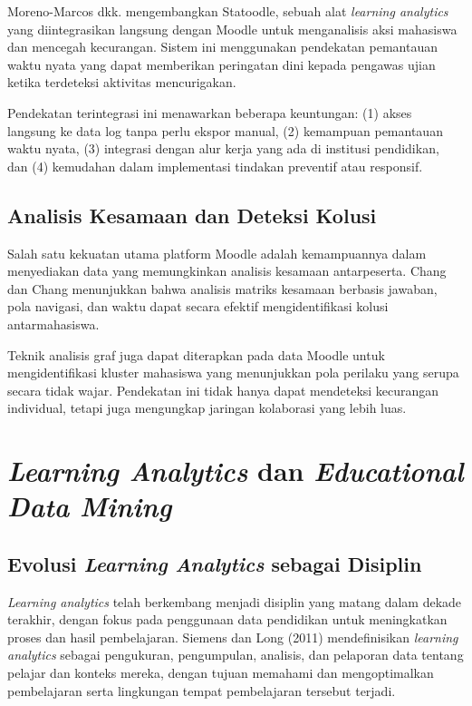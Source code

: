 Moreno-Marcos dkk. \cite{MorenoMarcos2023} mengembangkan Statoodle, sebuah alat \textit{learning analytics} yang diintegrasikan langsung dengan Moodle untuk menganalisis aksi mahasiswa dan mencegah kecurangan. Sistem ini menggunakan pendekatan pemantauan waktu nyata yang dapat memberikan peringatan dini kepada pengawas ujian ketika terdeteksi aktivitas mencurigakan.

Pendekatan terintegrasi ini menawarkan beberapa keuntungan: (1) akses langsung ke data log tanpa perlu ekspor manual, (2) kemampuan pemantauan waktu nyata, (3) integrasi dengan alur kerja yang ada di institusi pendidikan, dan (4) kemudahan dalam implementasi tindakan preventif atau responsif.

\subsection{Analisis Kesamaan dan Deteksi Kolusi}

Salah satu kekuatan utama platform Moodle adalah kemampuannya dalam menyediakan data yang memungkinkan analisis kesamaan antarpeserta. Chang dan Chang \cite{Chang2023} menunjukkan bahwa analisis matriks kesamaan berbasis jawaban, pola navigasi, dan waktu dapat secara efektif mengidentifikasi kolusi antarmahasiswa.

Teknik analisis graf juga dapat diterapkan pada data Moodle untuk mengidentifikasi kluster mahasiswa yang menunjukkan pola perilaku yang serupa secara tidak wajar. Pendekatan ini tidak hanya dapat mendeteksi kecurangan individual, tetapi juga mengungkap jaringan kolaborasi yang lebih luas.

\section{\textit{Learning Analytics} dan \textit{Educational Data Mining}}
\label{sec:learningAnalytics}

\subsection{Evolusi \textit{Learning Analytics} sebagai Disiplin}

\textit{Learning analytics} telah berkembang menjadi disiplin yang matang dalam dekade terakhir, dengan fokus pada penggunaan data pendidikan untuk meningkatkan proses dan hasil pembelajaran. Siemens dan Long (2011) mendefinisikan \textit{learning analytics} sebagai pengukuran, pengumpulan, analisis, dan pelaporan data tentang pelajar dan konteks mereka, dengan tujuan memahami dan mengoptimalkan pembelajaran serta lingkungan tempat pembelajaran tersebut terjadi.

